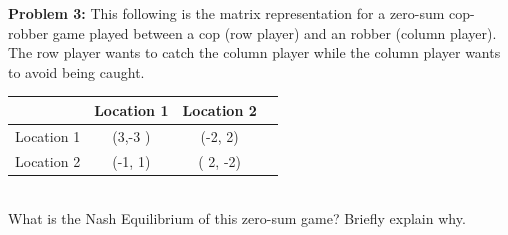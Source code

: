 \documentclass[a4paper]{article}
\newif\ifsol
\begin{document}
    \noindent \textbf{Problem 3:} This following is the matrix representation for a zero-sum cop-robber game played between a cop (row player) and an robber (column player). The row player wants to catch the column player while the column player wants to avoid being caught. \\
    \begin{table}[h]
    	\center
    	\begin{tabular}{|c|c|c|c|}
    		\hline
    		&Location 1&Location 2\\
    		\hline
    Location 1 & (3,-3 )& (-2, 2)\\
    		\hline
    	Location 2&(-1, 1)& ( 2, -2) \\
    		\hline
    	\end{tabular}
    \end{table} \\
    What is the Nash Equilibrium of this zero-sum game? Briefly explain why. \bigskip
    
    \ifsol
    {\color{blue} \noindent Again we compute both player's Maximin strategies. For the row player (cop), let $p$ be the probability of visiting location 1. Then the expected utility for the row player is:
    \begin{itemize}
    	\item when column player visits location 1: $3p -(1-p)$
    	\item when column player visits location 2:  $-2p + 2(1-p)$
    \end{itemize}
    Thus the Maximin strategy $(p^*, 1-p^* )$ solves the following optimization problem
    $$ \max_{p} \bigg[  \min{   \big\{ 4p - 1, 2 - 4p \big\}  } \bigg]$$
    The optimal solution is $p^* = 3/8$. Thus the Maximin strategy for the row player is $(3/8,5/8)$. A similar procedure shows that the Maximin strategy for the column player is $(1/2,1/2)$.  
    } 
    \else \bigskip \bigskip \bigskip \bigskip \bigskip \bigskip
    \fi
\end{document}
